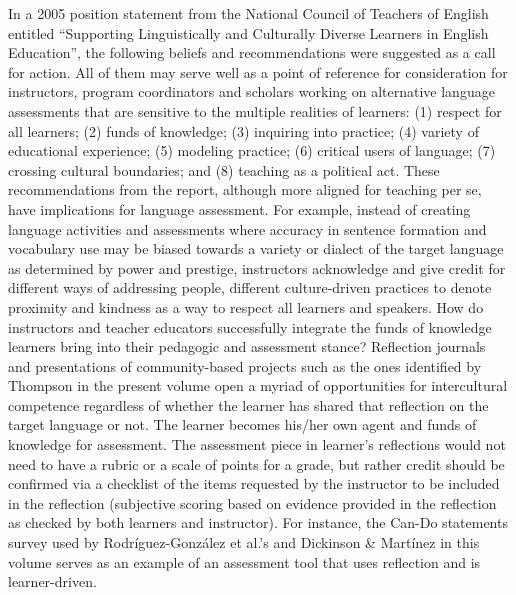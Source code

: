 \documentclass[output=paper]{langscibook}
\begin{document}
In a 2005 position statement from the National Council of Teachers of English \citep{NCTEJuly312005} entitled “Supporting Linguistically and Culturally Diverse Learners in English Education”, the following beliefs and recommendations were suggested as a call for action. All of them may serve well as a point of reference for consideration for instructors, program coordinators and scholars working on alternative language assessments that are sensitive to the multiple realities of learners: (1) respect for all learners; (2) funds of knowledge; (3) inquiring into practice; (4) variety of educational experience; (5) modeling practice; (6) critical users of language; (7) crossing cultural boundaries; and (8) teaching as a political act. These recommendations from the \citealt{NCTEJuly312005} report, although more aligned for teaching per se, have implications for language assessment. For example, instead of creating language activities and assessments where accuracy in sentence formation and vocabulary use may be biased towards a variety or dialect of the target language as determined by power and prestige, instructors acknowledge and give credit for different ways of addressing people, different culture-driven practices to denote proximity and kindness as a way to respect all learners and speakers. How do instructors and teacher educators successfully integrate the funds of knowledge learners bring into their pedagogic and assessment stance? Reflection journals and presentations of community-based projects such as the ones identified by Thompson in the present volume open a myriad of opportunities for intercultural competence regardless of whether the learner has shared that reflection on the target language or not. The learner becomes his/her own agent and funds of knowledge for assessment. The assessment piece in learner’s reflections would not need to have a rubric or a scale of points for a grade, but rather credit should be confirmed via a checklist of the items requested by the instructor to be included in the reflection (subjective scoring based on evidence provided in the reflection as checked by both learners and instructor). For instance, the Can-Do statements survey used by Rodríguez-González et al.'s and Dickinson \& Martínez in this volume serves as an example of an assessment tool that uses reflection and is learner-driven.
\end{document}
